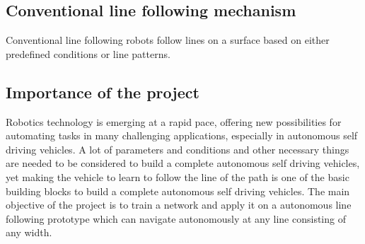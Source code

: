 \documentclass[14pt, a4paper]{article}
\begin{document}
	\subsection{Conventional line following mechanism}
	
	Conventional line following robots follow lines on a surface based on either predefined conditions or line patterns. 
	

	\subsection{Importance of the project}
	
	Robotics technology is emerging at a rapid pace, offering new possibilities for automating tasks in many challenging applications, especially in autonomous self driving vehicles. A lot of parameters and conditions and other necessary things are needed to be considered to build a complete autonomous self driving vehicles, yet making the vehicle to learn to follow the line of the path is one of the basic building blocks to build a complete autonomous self driving vehicles. The main objective of the project is to train a network and apply it on a autonomous line following prototype which can navigate autonomously at any line consisting of any width. 
\end{document}
